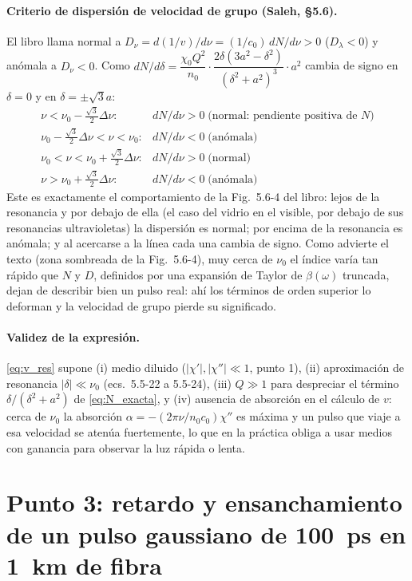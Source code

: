 \documentclass{article}
\newcommand{\Dnu}{D_\nu}
\newcommand{\Dlam}{D_\lambda}
\begin{document}
\paragraph{Criterio de dispersión de velocidad de grupo (Saleh, §5.6).} El libro llama normal a
$\Dnu=d(1/v)/d\nu=(1/c_0)\,dN/d\nu>0$ ($\Dlam<0$) y anómala a $\Dnu<0$. Como
$dN/d\delta=\dfrac{\chi_0Q^2}{n_0}\cdot\dfrac{2\delta(3a^2-\delta^2)}{(\delta^2+a^2)^3}\cdot a^2$
cambia de signo en $\delta=0$ y en $\delta=\pm\sqrt3a$:
\[
\begin{array}{ll}
\nu<\nu_0-\tfrac{\sqrt3}{2}\Delta\nu: & dN/d\nu>0 \;\text{(normal: pendiente positiva de $N$)}\\[2pt]
\nu_0-\tfrac{\sqrt3}{2}\Delta\nu<\nu<\nu_0: & dN/d\nu<0 \;\text{(anómala)}\\[2pt]
\nu_0<\nu<\nu_0+\tfrac{\sqrt3}{2}\Delta\nu: & dN/d\nu>0 \;\text{(normal)}\\[2pt]
\nu>\nu_0+\tfrac{\sqrt3}{2}\Delta\nu: & dN/d\nu<0 \;\text{(anómala)}
\end{array}
\]
Este es exactamente el comportamiento de la Fig.~5.6-4 del libro: lejos de la resonancia y por
debajo de ella (el caso del vidrio en el visible, por debajo de sus resonancias ultravioletas) la dispersión es
normal; por encima de la resonancia es anómala; y al acercarse a la línea cada una cambia de
signo. Como advierte el texto (zona sombreada de la Fig.~5.6-4), muy cerca
de $\nu_0$ el índice varía tan rápido que $N$ y $D$, definidos por una
expansión de Taylor de $\beta(\omega)$ truncada, dejan de describir bien un pulso real: ahí los
términos de orden superior lo deforman y la velocidad de grupo pierde su significado.

\paragraph{Validez de la expresión.} \eqref{eq:v_res} supone (i) medio diluido
($|\chi'|,|\chi''|\ll1$, punto 1), (ii) aproximación de resonancia $|\delta|\ll\nu_0$
(ecs.~5.5-22 a 5.5-24), (iii) $Q\gg1$ para despreciar el término $\delta/(\delta^2+a^2)$ de
\eqref{eq:N_exacta}, y (iv) ausencia de absorción en el cálculo de $v$: cerca de $\nu_0$ la
absorción $\alpha=-(2\pi\nu/n_0c_0)\chi''$ es máxima y un pulso que viaje a esa velocidad se
atenúa fuertemente, lo que en la práctica obliga a usar medios con ganancia para observar la luz
rápida o lenta.

\section{Punto 3: retardo y ensanchamiento de un pulso gaussiano de \SI{100}{ps} en \SI{1}{km} de fibra}
\end{document}
